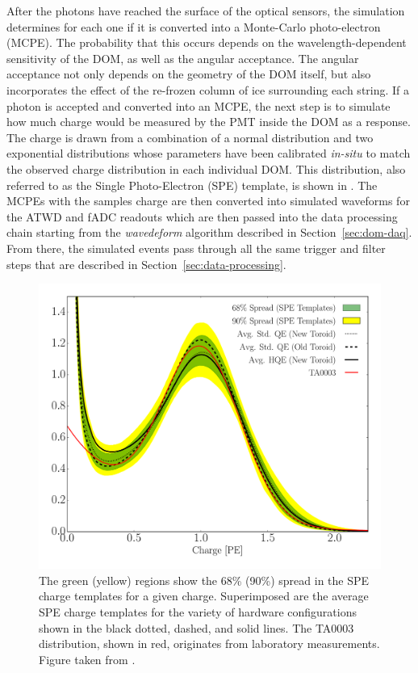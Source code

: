 After the photons have reached the surface of the optical sensors, the simulation determines for each one if it is converted into a Monte-Carlo photo-electron (MCPE). The probability that this occurs depends on the wavelength-dependent sensitivity of the DOM, as well as the angular acceptance. The angular acceptance not only depends on the geometry of the DOM itself, but also incorporates the effect of the re-frozen column of ice surrounding each string. If a photon is accepted and converted into an MCPE, the next step is to simulate how much charge would be measured by the PMT inside the DOM as a response. The charge is drawn from a combination of a normal distribution and two exponential distributions whose parameters have been calibrated \emph{in-situ} to match the observed charge distribution in each individual DOM. This distribution, also referred to as the Single Photo-Electron (SPE) template, is shown in . The MCPEs with the samples charge are then converted into simulated waveforms for the ATWD and fADC readouts which are then passed into the data processing chain starting from the \emph{wavedeform} algorithm described in Section~\ref{sec:dom-daq}. From there, the simulated events pass through all the same trigger and filter steps that are described in Section~\ref{sec:data-processing}.

\begin{figure}
    \centering
    \includegraphics[width=0.8\linewidth]{figures/icecube/detector_response/SPE_TA003_2.pdf}
    \caption{The green (yellow) regions show the 68\% (90\%) spread in the SPE charge templates for a given charge.  Superimposed are the average SPE charge templates for the variety of hardware configurations shown in the black dotted, dashed, and solid lines. The TA0003 distribution, shown in red, originates from laboratory measurements. Figure taken from \cite{ic_spe_20}.}
    \label{fig:spe-templates}
\end{figure}

